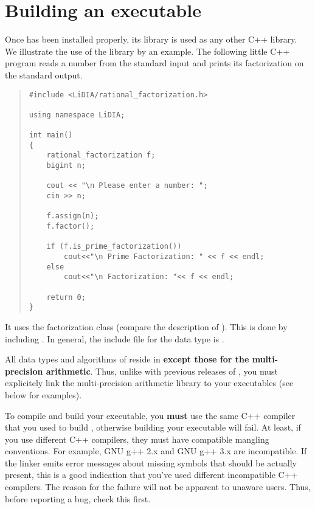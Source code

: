 \section{Building an executable}

Once \LiDIA has been installed properly, its library is used as any other
C++ library.  We illustrate the use of the \LiDIA library by an example.
The following little C++ program reads a number from the standard input and
prints its factorization on the standard output.

\begin{quote}
\begin{verbatim}
#include <LiDIA/rational_factorization.h>

using namespace LiDIA;

int main()
{
    rational_factorization f;
    bigint n;

    cout << "\n Please enter a number: ";
    cin >> n;

    f.assign(n);
    f.factor();

    if (f.is_prime_factorization())
        cout<<"\n Prime Factorization: " << f << endl;
    else
        cout<<"\n Factorization: "<< f << endl;

    return 0;
}
\end{verbatim}
\end{quote}

It uses the \LiDIA factorization class (compare the description of
).  This is done by including
.  In general, the \LiDIA include
file for the data type  is .

\attentionIII All data types and algorithms of \LiDIA reside in
 \textbf{except those for the multi-precision arithmetic}.
Thus, unlike with previous releases of \LiDIA, you must explicitely link
the multi-precision arithmetic library to your executables (see below for
examples).

\attentionIII To compile and build your executable, you \textbf{must} use
the same C++ compiler that you used to build \LiDIA, otherwise building
your executable will fail.  At least, if you use different C++ compilers,
they must have compatible mangling conventions.  For example, GNU g++ 2.x
and GNU g++ 3.x are incompatible.  If the linker emits error messages about
missing symbols that should be actually present, this is a good indication
that you've used different incompatible C++ compilers.  The reason for the
failure will not be apparent to unaware users.  Thus, before reporting a
bug, check this first.

